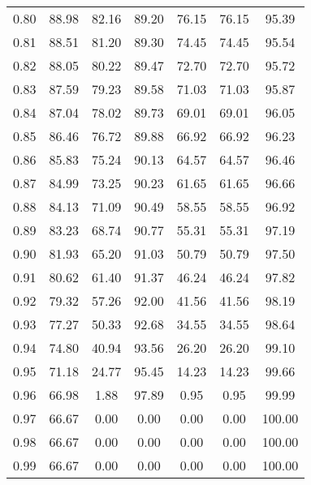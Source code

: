 \begin{tabular}{|c|c|c|c|c|c|c|}
      0.80 &     88.98 &     82.16 &      89.20 &   76.15 &      76.15 &         95.39 \\
      0.81 &     88.51 &     81.20 &      89.30 &   74.45 &      74.45 &         95.54 \\
      0.82 &     88.05 &     80.22 &      89.47 &   72.70 &      72.70 &         95.72 \\
      0.83 &     87.59 &     79.23 &      89.58 &   71.03 &      71.03 &         95.87 \\
      0.84 &     87.04 &     78.02 &      89.73 &   69.01 &      69.01 &         96.05 \\
      0.85 &     86.46 &     76.72 &      89.88 &   66.92 &      66.92 &         96.23 \\
      0.86 &     85.83 &     75.24 &      90.13 &   64.57 &      64.57 &         96.46 \\
      0.87 &     84.99 &     73.25 &      90.23 &   61.65 &      61.65 &         96.66 \\
      0.88 &     84.13 &     71.09 &      90.49 &   58.55 &      58.55 &         96.92 \\
      0.89 &     83.23 &     68.74 &      90.77 &   55.31 &      55.31 &         97.19 \\
      0.90 &     81.93 &     65.20 &      91.03 &   50.79 &      50.79 &         97.50 \\
      0.91 &     80.62 &     61.40 &      91.37 &   46.24 &      46.24 &         97.82 \\
      0.92 &     79.32 &     57.26 &      92.00 &   41.56 &      41.56 &         98.19 \\
      0.93 &     77.27 &     50.33 &      92.68 &   34.55 &      34.55 &         98.64 \\
      0.94 &     74.80 &     40.94 &      93.56 &   26.20 &      26.20 &         99.10 \\
      0.95 &     71.18 &     24.77 &      95.45 &   14.23 &      14.23 &         99.66 \\
      0.96 &     66.98 &      1.88 &      97.89 &    0.95 &       0.95 &         99.99 \\
      0.97 &     66.67 &      0.00 &       0.00 &    0.00 &       0.00 &        100.00 \\
      0.98 &     66.67 &      0.00 &       0.00 &    0.00 &       0.00 &        100.00 \\
      0.99 &     66.67 &      0.00 &       0.00 &    0.00 &       0.00 &        100.00 \\
\bottomrule
\end{tabular}
